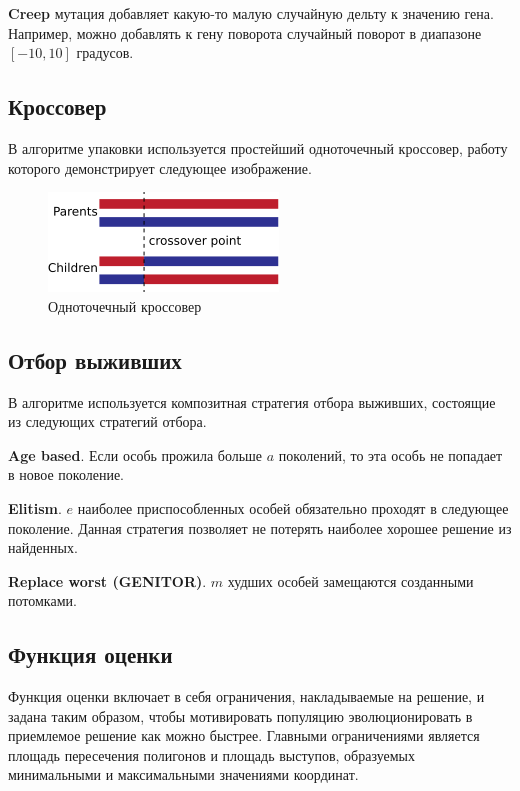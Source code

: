 \documentclass{fefu_thesis/cls/fefu}
\begin{document}
    \textbf{Creep} мутация добавляет какую-то малую случайную дельту к значению гена. Например, можно добавлять к гену поворота случайный поворот в диапазоне $\left[-10, 10\right]$ градусов.

    \subsection{Кроссовер}
    В алгоритме упаковки используется простейший одноточечный кроссовер, работу которого демонстрирует следующее изображение.
    \begin{figure}[H]
        \centering
        \includegraphics[scale=1]{images/OnePointCrossover.png}
        \caption{Одноточечный кроссовер}
    \end{figure}

    \subsection{Отбор выживших}
    В алгоритме используется композитная стратегия отбора выживших, состоящие из следующих стратегий отбора.

    \textbf{Age based}. Если особь прожила больше $a$ поколений, то эта особь не попадает в новое поколение.

    \textbf{Elitism}. $e$ наиболее приспособленных особей обязательно проходят в следующее поколение. Данная стратегия позволяет не потерять наиболее хорошее решение из найденных.

    \textbf{Replace worst (GENITOR)}. $m$ худших особей замещаются созданными потомками.
    \subsection{Функция оценки}
    Функция оценки включает в себя ограничения, накладываемые на решение, и задана таким образом, чтобы мотивировать популяцию эволюционировать в приемлемое решение как можно быстрее. Главными ограничениями является площадь пересечения полигонов и площадь выступов, образуемых минимальными и максимальными значениями координат.
\end{document}
